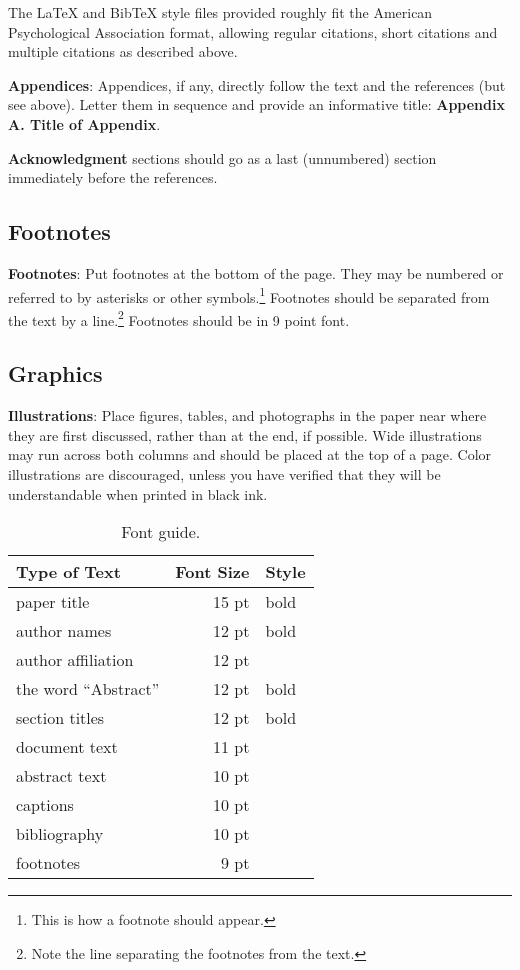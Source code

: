 \documentclass[11pt,letterpaper]{article}
\begin{document}
The \LaTeX{} and Bib\TeX{} style files provided roughly fit the
American Psychological Association format, allowing regular citations,
short citations and multiple citations as described above.

{\bf Appendices}: Appendices, if any, directly follow the text and the
references (but see above).  Letter them in sequence and provide an
informative title: {\bf Appendix A. Title of Appendix}.

\textbf{Acknowledgment} sections should go as a last (unnumbered) section immediately
before the references.

\subsection{Footnotes}

{\bf Footnotes}: Put footnotes at the bottom of the page. They may
be numbered or referred to by asterisks or other
symbols.\footnote{This is how a footnote should appear.} Footnotes
should be separated from the text by a line.\footnote{Note the
line separating the footnotes from the text.}  Footnotes should be in 9 point font.

\subsection{Graphics}

{\bf Illustrations}: Place figures, tables, and photographs in the
paper near where they are first discussed, rather than at the end, if
possible.  Wide illustrations may run across both columns and should be placed at
the top of a page. Color illustrations are discouraged, unless you have verified that
they will be understandable when printed in black ink.

\begin{table}
\begin{center}
\begin{tabular}{|l|rl|}
\hline \bf Type of Text & \bf Font Size & \bf Style \\ \hline
paper title & 15 pt & bold \\
author names & 12 pt & bold \\
author affiliation & 12 pt & \\
the word ``Abstract'' & 12 pt & bold \\
section titles & 12 pt & bold \\
document text & 11 pt  &\\
abstract text & 10 pt & \\
captions & 10 pt & \\
bibliography & 10 pt & \\
footnotes & 9 pt & \\
\hline
\end{tabular}
\end{center}
\caption{\label{font-table} Font guide. }
\end{table}
\end{document}
